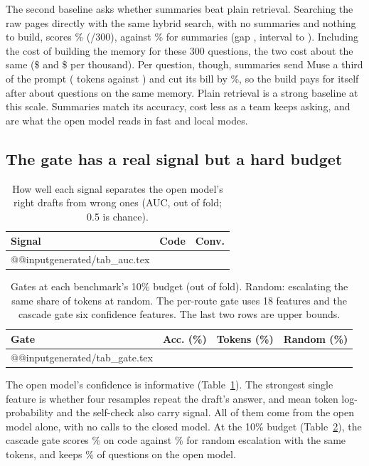 \documentclass[10pt,twocolumn]{article}
\makeatletter
\newcommand{\rows}[1]{\csname @@input\endcsname generated/#1 }
\makeatother
\begin{document}
The second baseline asks whether summaries beat plain retrieval. Searching the raw pages directly with the same hybrid search, with no summaries and nothing to build, scores \accPages\% (\countPages/300), against \accSweCompact\% for summaries (gap \memoryOverPages, interval \memoryOverPagesLo{} to \memoryOverPagesHi). Including the cost of building the memory for these 300 questions, the two cost about the same (\$\usdPagesDirect{} and \$\usdMemory{} per thousand). Per question, though, summaries send Muse a third of the prompt (\promptCompact{} tokens against \promptPages) and cut its bill by \museDropPages\%, so the build pays for itself after about \breakEvenPages{} questions on the same memory. Plain retrieval is a strong baseline at this scale. Summaries match its accuracy, cost less as a team keeps asking, and are what the open model reads in fast and local modes.

\subsection{The gate has a real signal but a hard budget}

\begin{table}[t]
\centering
\small
\caption{How well each signal separates the open model's right drafts from wrong ones (AUC, out of fold; 0.5 is chance).}
\label{tab:auc}
\begin{tabular}{lcc}
\toprule
Signal & Code & Conv.\\
\midrule
\rows{tab_auc.tex}
\bottomrule
\end{tabular}
\end{table}

\begin{table}[t]
\centering
\small
\setlength{\tabcolsep}{5pt}
\caption{Gates at each benchmark's 10\% budget (out of fold). Random: escalating the same share of tokens at random. The per-route gate uses 18 features and the cascade gate six confidence features. The last two rows are upper bounds.}
\label{tab:gate}
\begin{tabular}{lrrr}
\toprule
Gate & Acc. (\%) & Tokens (\%) & Random (\%)\\
\midrule
\rows{tab_gate.tex}
\bottomrule
\end{tabular}
\end{table}

The open model's confidence is informative (Table~\ref{tab:auc}). The strongest single feature is whether four resamples repeat the draft's answer, and mean token log-probability and the self-check also carry signal. All of them come from the open model alone, with no calls to the closed model. At the 10\% budget (Table~\ref{tab:gate}), the cascade gate scores \cascadeSwe\% on code against \randomSwe\% for random escalation with the same tokens, and keeps \cascadeKeptSwe\% of questions on the open model.
\end{document}
